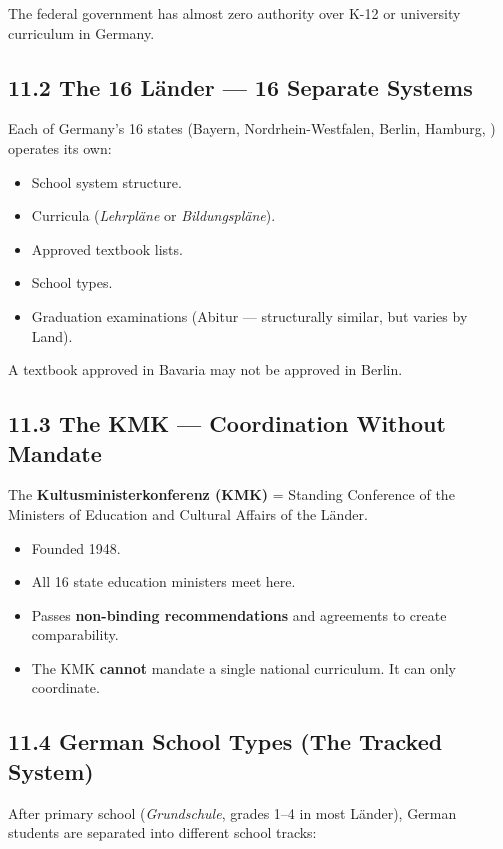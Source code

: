 	The federal government has almost zero authority over K-12 or university curriculum in Germany.

	\subsection{11.2 The 16 Länder --- 16 Separate Systems}

	Each of Germany's 16 states (Bayern, Nordrhein-Westfalen, Berlin, Hamburg, \etc) operates its own:
	\begin{itemize}
		\item School system structure.
		\item Curricula (\textit{Lehrpläne} or \textit{Bildungspläne}).
		\item Approved textbook lists.
		\item School types.
		\item Graduation examinations (Abitur --- structurally similar, but varies by Land).
	\end{itemize}

	A textbook approved in Bavaria may not be approved in Berlin.

	\subsection{11.3 The KMK --- Coordination Without Mandate}

	The \textbf{Kultusministerkonferenz (KMK)} = Standing Conference of the Ministers of Education and Cultural Affairs of the Länder.
	\begin{itemize}
		\item Founded 1948.
		\item All 16 state education ministers meet here.
		\item Passes \textbf{non-binding recommendations} and agreements to create comparability.
		\item The KMK \textbf{cannot} mandate a single national curriculum. It can only coordinate.
	\end{itemize}

	\subsection{11.4 German School Types (The Tracked System)}

	After primary school (\textit{Grundschule}, grades 1--4 in most Länder), German students are separated into different school tracks:


